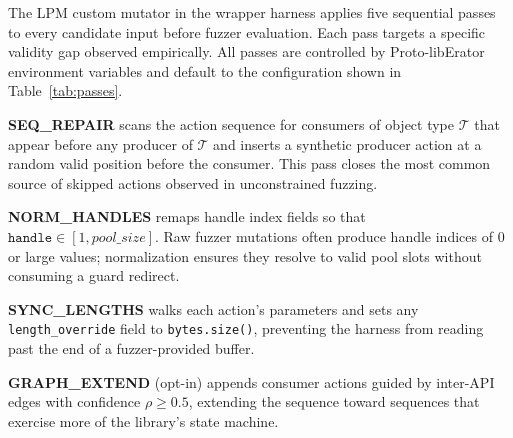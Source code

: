 \documentclass[sigconf,anonymous]{acmart}
\begin{document}
The LPM custom mutator in the wrapper harness applies five sequential
passes to every candidate input before fuzzer evaluation.  Each pass
targets a specific validity gap observed empirically.  All passes are
controlled by Proto-libErator environment variables and default to the
configuration shown in Table~\ref{tab:passes}.

\begin{table}[h]
\centering
\caption{Custom mutator passes.}
\label{tab:passes}
\end{table}

\textbf{SEQ\_REPAIR} scans the action sequence for consumers of object type
$\mathcal{T}$ that appear before any producer of $\mathcal{T}$ and inserts
a synthetic producer action at a random valid position before the consumer.
This pass closes the most common source of skipped actions observed in
unconstrained fuzzing.

\textbf{NORM\_HANDLES} remaps handle index fields so that
$\texttt{handle} \in [1, \textit{pool\_size}]$.  Raw fuzzer mutations
often produce handle indices of $0$ or large values; normalization
ensures they resolve to valid pool slots without consuming a guard
redirect.

\textbf{SYNC\_LENGTHS} walks each action's parameters and sets any
\texttt{length\_override} field to \texttt{bytes.size()}, preventing
the harness from reading past the end of a fuzzer-provided buffer.

\textbf{GRAPH\_EXTEND} (opt-in) appends consumer actions guided by
inter-API edges with confidence $\rho \geq 0.5$, extending the sequence
toward sequences that exercise more of the library's state machine.
\end{document}
